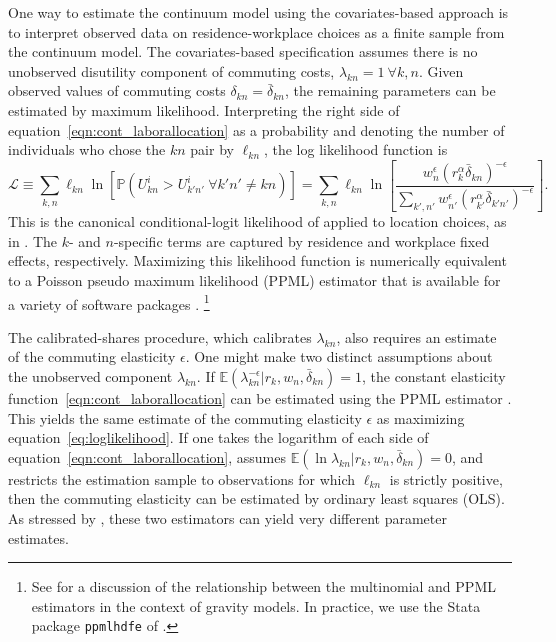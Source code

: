 \documentclass[11pt]{article}
\theoremstyle{definition}
\begin{document}
One way to estimate the continuum model using the covariates-based approach is
to interpret observed data on residence-workplace choices as a finite sample from the continuum model.
The covariates-based specification assumes there is no unobserved disutility component of commuting costs, $\lambda_{kn}=1 \ \forall k,n$.
Given observed values of commuting costs $\delta_{kn} = \bar{\delta}_{kn}$,
the remaining parameters can be estimated by maximum likelihood.
Interpreting the right side of equation~\eqref{eqn:cont_laborallocation} as a probability
and
denoting the number of individuals who chose the $kn$ pair by $\ell_{kn}$,
the log likelihood function is
\begin{equation}\label{eq:loglikelihood}
\mathcal{L}
\equiv
\sum_{k,n} \ell_{kn} \ln \left[\mathbb{P}(U_{kn}^{i} > U_{k'n'}^{i} \ \forall k'n' \neq kn)\right] 
=
\sum_{k,n} \ell_{kn} \ln \left[
\frac
{{w}_{n}^\epsilon \left({r}_{k}^\alpha  \bar{\delta}_{kn}\right)^{-\epsilon}}
{\sum_{k',n'} {w}_{n'}^\epsilon \left({r}_{k'}^\alpha  \bar{\delta}_{k'n'}\right)^{-\epsilon}}
\right]
.\end{equation}
This is the canonical conditional-logit likelihood of \cite{McFadden:1974} applied to location choices, as in \cite{McFadden:1978}.
The $k$- and $n$-specific terms are captured by residence and workplace fixed effects, respectively.
Maximizing this likelihood function is numerically equivalent to
a Poisson pseudo maximum likelihood (PPML) estimator that is available for a variety of software packages
\citep{GuimaraesFigueiredoWoodward:2003}.%
\footnote{See \cite{Sotelo:2019} for a discussion of the relationship between the multinomial and PPML estimators in the context of gravity models.
In practice, we use the Stata package \texttt{ppmlhdfe} of \cite{CorreiaGuimaraesZylkin:2020}.}


The calibrated-shares procedure, which calibrates $\lambda_{kn}$, also requires an estimate of the commuting elasticity $\epsilon$.
One might make two distinct assumptions about the unobserved component $\lambda_{kn}$.
If $\mathbb{E}\left(\lambda_{kn}^{-\epsilon}\vert {r}_{k},{w}_{n},\bar{\delta}_{kn} \right)=1$,
the constant elasticity function~\eqref{eqn:cont_laborallocation} can be estimated using the PPML estimator
\citep{SilvaTenreyro:2006}.
This yields the same estimate of the commuting elasticity $\epsilon$ as maximizing equation~\eqref{eq:loglikelihood}.
If one takes the logarithm of each side of equation~\eqref{eqn:cont_laborallocation},
assumes $\mathbb{E}\left(\ln \lambda_{kn}\vert {r}_{k},{w}_{n},\bar{\delta}_{kn} \right)=0$,
and
restricts the estimation sample to observations for which $\ell_{kn}$ is strictly positive,
then the commuting elasticity can be estimated by ordinary least squares (OLS).
As stressed by \cite{SilvaTenreyro:2006},
these two estimators can yield very different parameter estimates.
\end{document}
